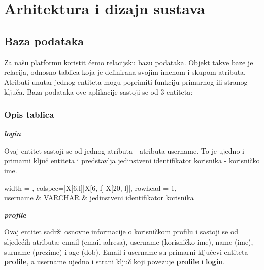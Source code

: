 \chapter{Arhitektura i dizajn sustava}

		\section{Baza podataka}
			
		Za našu platformu koristit ćemo relacijsku bazu podataka. Objekt takve baze je relacija, odnosno tablica koja je definirana svojim imenom i skupom atributa. Atributi unutar jednog entiteta mogu poprimiti funkciju primarnog ili stranog ključa.
Baza podataka ove aplikacije sastoji se od 3 entiteta:
		
			\subsection{Opis tablica}
			
\textbf{\textit{login}}\\
\begin{samepage}
Ovaj entitet sastoji se od jednog atributa - atributa username. To je ujedno i primarni ključ entiteta i predstavlja jedinstveni identifikator korisnika - korisničko ime.
\end{samepage}
				
				
				\begin{longtblr}[
					label=none,
					entry=none
					]{
						width = \textwidth,
						colspec={|X[6,l]|X[6, l]|X[20, l]|}, 
						rowhead = 1,
					} %
					\hline {}	 \\ \hline[3pt]
					username & VARCHAR	&  	jedinstveni identifikator korisnika 	\\ \hline
				\end{longtblr}

    \eject
\noindent \textbf{\textit{profile}}\\
\begin{samepage}
Ovaj entitet sadrži osnovne informacije o korisničkom profilu i  sastoji se od sljedećih atributa: email (email adresa), username (korisničko ime), name (ime), surname (prezime) i age (dob). Email i username su primarni ključevi entiteta \textbf{profile}, a username ujedno i strani ključ koji povezuje \textbf{profile} i \textbf{login}.
\end{samepage}


